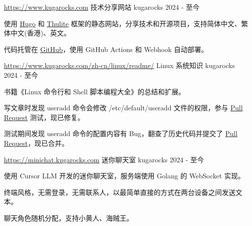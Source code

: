 

\begin{cventries}

  \cventry
    {\href{https://www.kugarocks.com}{\uline{https://www.kugarocks.com}}} %
    {技术分享网站} %
    {kugarocks} %
    {2024 - 至今} %
    {
      \begin{cvitems} %
        \item {使用 \href{https://gohugo.io/}{\uline{Hugo}} 和 \href{https://thulite.io/}{\uline{Thulite}} 框架的静态网站，分享技术和开源项目，支持简体中文、繁体中文(香港)、英文。}
        \item {代码托管在 \href{https://github.com/kugarocks/kugarocks.github.io}{\uline{GitHub}}，使用 GitHub Actions 和 Webhook 自动部署。}
      \end{cvitems}
    }

  \cventry
    {\href{https://www.kugarocks.com/zh-cn/linux/readme/}{\uline{https://www.kugarocks.com/zh-cn/linux/readme/}}} %
    {Linux 系统知识} %
    {kugarocks} %
    {2024 - 至今} %
    {
      \begin{cvitems} %
        \item {书籍《Linux 命令行和 Shell 脚本编程大全》的总结和扩展。}
        \item {写文章时发现 useradd 命令会修改 /etc/default/useradd 文件的权限，参与 \href{https://github.com/shadow-maint/shadow/pull/1083}{\uline{Pull Request}} 测试，现已修复。}
        \item {测试期间发现 useradd 命令的配置内容有 Bug，翻查了历史代码并提交了 \href{https://github.com/shadow-maint/shadow/pull/1086}{\uline{Pull Request}}，现已合并。}
      \end{cvitems}
    }

  \cventry
    {\href{https://minichat.kugarocks.com}{\uline{https://minichat.kugarocks.com}}} %
    {迷你聊天室} %
    {kugarocks} %
    {2024 - 至今} %
    {
      \begin{cvitems} %
        \item {使用 Cursor LLM 开发的迷你聊天室，服务端使用 Golang 的 WebSocket 实现。}
        \item {终端风格，无需登录，无需联系人，以最简单直接的方式在两台设备之间发送文本。}
        \item {聊天角色随机分配，支持小黄人、海贼王。}
      \end{cvitems}
    }


\end{cventries}
